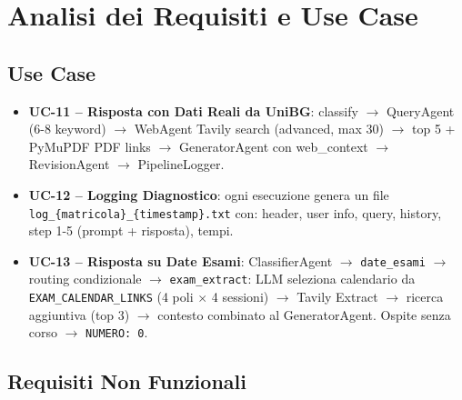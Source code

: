\documentclass[a4paper,12pt]{report}
\begin{document}
\section{Analisi dei Requisiti e Use Case}

\subsection{Use Case}

\begin{itemize}
    \item \textbf{UC-11 -- Risposta con Dati Reali da UniBG}: classify $\rightarrow$ QueryAgent (6-8 keyword) $\rightarrow$ WebAgent Tavily search (advanced, max 30) $\rightarrow$ top 5 + PyMuPDF PDF links $\rightarrow$ GeneratorAgent con web\_context $\rightarrow$ RevisionAgent $\rightarrow$ PipelineLogger.

    \item \textbf{UC-12 -- Logging Diagnostico}: ogni esecuzione genera un file \texttt{log\_\{matricola\}\_\{timestamp\}.txt} con: header, user info, query, history, step 1-5 (prompt + risposta), tempi.

    \item \textbf{UC-13 -- Risposta su Date Esami}: ClassifierAgent $\rightarrow$ \texttt{date\_esami} $\rightarrow$ routing condizionale $\rightarrow$ \texttt{exam\_extract}: LLM seleziona calendario da \texttt{EXAM\_CALENDAR\_LINKS} (4 poli $\times$ 4 sessioni) $\rightarrow$ Tavily Extract $\rightarrow$ ricerca aggiuntiva (top 3) $\rightarrow$ contesto combinato al GeneratorAgent. Ospite senza corso $\rightarrow$ \texttt{NUMERO: 0}.
\end{itemize}

\subsection{Requisiti Non Funzionali}
\end{document}

